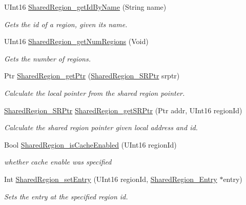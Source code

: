 \begin{DoxyCompactItemize}
U\-Int16 \hyperlink{_shared_region_8h_a67a530716a59b8794fee523cc8845f2c}{Shared\-Region\-\_\-get\-Id\-By\-Name} (String name)
\begin{DoxyCompactList}\small\item\em Gets the id of a region, given its name. \end{DoxyCompactList}\item 
U\-Int16 \hyperlink{_shared_region_8h_a5fb23b15b5321edd51438108b7fd9cfe}{Shared\-Region\-\_\-get\-Num\-Regions} (Void)
\begin{DoxyCompactList}\small\item\em Gets the number of regions. \end{DoxyCompactList}\item 
Ptr \hyperlink{_shared_region_8h_a2b64c07cb305a034417a42fb1ed8e7a9}{Shared\-Region\-\_\-get\-Ptr} (\hyperlink{_shared_region_8h_a3efe06da0fa1fcbb3b271278ddd9b410}{Shared\-Region\-\_\-\-S\-R\-Ptr} srptr)
\begin{DoxyCompactList}\small\item\em Calculate the local pointer from the shared region pointer. \end{DoxyCompactList}\item 
\hyperlink{_shared_region_8h_a3efe06da0fa1fcbb3b271278ddd9b410}{Shared\-Region\-\_\-\-S\-R\-Ptr} \hyperlink{_shared_region_8h_a7362baec546e36b21e82f35746b4ab3b}{Shared\-Region\-\_\-get\-S\-R\-Ptr} (Ptr addr, U\-Int16 region\-Id)
\begin{DoxyCompactList}\small\item\em Calculate the shared region pointer given local address and id. \end{DoxyCompactList}\item 
Bool \hyperlink{_shared_region_8h_afcd99988acc5d3b6b9dd809c49692185}{Shared\-Region\-\_\-is\-Cache\-Enabled} (U\-Int16 region\-Id)
\begin{DoxyCompactList}\small\item\em whether cache enable was specified \end{DoxyCompactList}\item 
Int \hyperlink{_shared_region_8h_a03f6986f76660e57a41ee312545e9f7d}{Shared\-Region\-\_\-set\-Entry} (U\-Int16 region\-Id, \hyperlink{struct_shared_region___entry}{Shared\-Region\-\_\-\-Entry} $\ast$entry)
\begin{DoxyCompactList}\small\item\em Sets the entry at the specified region id. \end{DoxyCompactList}\item 

\end{DoxyCompactItemize}
